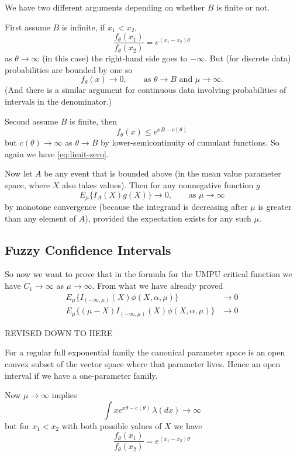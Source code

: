 \documentclass[11pt]{article}
\begin{document}
We have two different arguments depending on whether $B$ is finite or not.

First assume $B$ is infinite, if $x_1 < x_2$,
$$
   \frac{f_\theta(x_1)}{f_\theta(x_2)} = e^{(x_1 - x_2) \theta}
$$
as $\theta \to \infty$ (in this case) the right-hand side goes to $- \infty$.
But (for discrete data) probabilities are bounded by one so
\begin{equation} \label{eq:limit-zero}
   f_\theta(x) \to 0, \qquad \text{as $\theta \to B$ and $\mu \to \infty$}.
\end{equation}
(And there is a similar argument for continuous data involving probabilities
of intervals in the denominator.)

Second assume $B$ is finite, then
$$
   f_\theta(x) \le e^{x B - c(\theta)}
$$
but $c(\theta) \to \infty$ as $\theta \to B$ by lower-semicontinuity
of cumulant functions.  So again we have \eqref{eq:limit-zero}.

Now let $A$ be any event that is bounded above (in the mean value parameter
space, where $X$ also takes values).  Then for any nonnegative function $g$
$$
    E_\mu \{ I_A(X) g(X) \} \to 0, \qquad \text{as $\mu \to \infty$}
$$
by monotone convergence (because the integrand is decreasing after $\mu$
is greater than any element of $A$), provided the expectation exists for
any such $\mu$.

\subsection{Fuzzy Confidence Intervals}

So now we want to prove that in the formula for the UMPU critical function
we have $C_1 \to \infty$ as $\mu \to \infty$.
From what we have already proved
\begin{align*}
   E_\mu\{ I_{(- \infty, \mu)}(X) \phi(X, \alpha, \mu) \} & \to 0
   \\
   E_\mu\{ (\mu - X) I_{(- \infty, \mu)}(X) \phi(X, \alpha, \mu) \} & \to 0
\end{align*}

\begin{center} \LARGE REVISED DOWN TO HERE \end{center}

For a regular full exponential family the canonical parameter space
is an open convex subset of the vector space where that parameter lives.
Hence an open interval if we have a one-parameter family.

Now $\mu \to \infty$ implies
$$
   \int x e^{x \theta - c(\theta)} \, \lambda(d x) \to \infty
$$
but for $x_1 < x_2$ with both possible values of $X$ we have
$$
   \frac{f_\theta(x_1)}{f_\theta(x_2)} = e^{(x_1 - x_2) \theta}
$$
\end{document}
